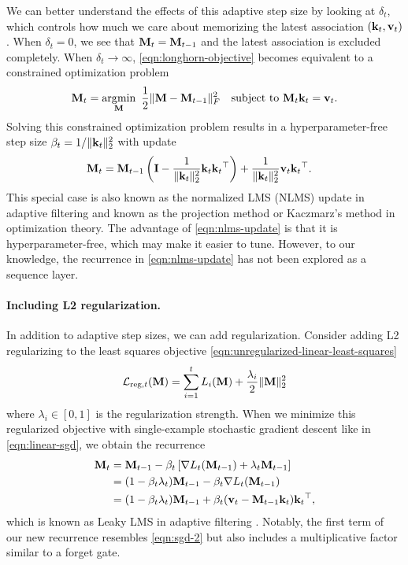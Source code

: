 \documentclass[notitlepage, 11pt]{article}
\begin{document}
We can better understand the effects of this adaptive step size by looking at $\delta_t$, which controls how much we care about memorizing the latest association $(\mathbf{k}_t, \mathbf{v}_t)$.
When $\delta_t = 0$, we see that $\mathbf{M}_t = \mathbf{M}_{t-1}$ and the latest association is excluded completely.
When $\delta_t \to \infty$, \autoref{eqn:longhorn-objective} becomes equivalent to a constrained optimization problem
\begin{align}
\mathbf{M}_{t} = \operatorname*{\arg\!\min}_{\mathbf{M}}\ \frac{1}{2}\lVert\mathbf{M} - \mathbf{M}_{t-1}\rVert_F^2\quad \text{subject to}\  \mathbf{M}_t\mathbf{k}_t = \mathbf{v}_t.\label{eqn:nlms-objective}
\end{align}
Solving this constrained optimization problem results in a hyperparameter-free step size $\beta_t=1/\lVert\mathbf{k}_t\rVert_2^2$ with update
\begin{align}
    \mathbf{M}_{t} &= \mathbf{M}_{t-1}\left(\mathbf{I} - \frac{1}{\lVert\mathbf{k}_t\rVert_2^2} {\mathbf{k}_t\mathbf{k}_t{}^\top}\right) + \frac{1}{ \lVert\mathbf{k}_t\rVert_2^2}\mathbf{v}_t\mathbf{k}_t{}^\top.\label{eqn:nlms-update}
\end{align}
This special case is also known as the normalized LMS (NLMS) update in adaptive filtering \citep{Castoldi2009MinimumdisturbanceDescriptionDevelopment} and known as the projection method \citep{Tanabe1971ProjectionMethodSolving} or Kaczmarz's method \citep{Kaczmarz1937AngenaherteAuflosungSystemen} in optimization theory.
The advantage of \autoref{eqn:nlms-update} is that it is hyperparameter-free, which may make it easier to tune.
However, to our knowledge, the recurrence in \autoref{eqn:nlms-update} has not been explored as a sequence layer.









\paragraph{Including L2 regularization.}
In addition to adaptive step sizes, we can add regularization.
Consider adding L2 regularizing to the least squares objective \autoref{eqn:unregularized-linear-least-squares}
\begin{align}
    \mathcal{L}_{\text{reg}, t}(\mathbf{M}) = \sum_{i=1}^t L_i(\mathbf{M}) + \frac{\lambda_i}{2}\lVert\mathbf{M}\rVert_2^2
\end{align}
where $\lambda_i\in [0, 1]$ is the regularization strength.
When we minimize this regularized objective with single-example stochastic gradient descent like in \autoref{eqn:linear-sgd}, we obtain the recurrence
\begin{align}
    \mathbf{M}_t &= \mathbf{M}_{t-1} -\beta_t \left[\nabla L_t(\mathbf{M}_{t-1}) + \lambda_t \mathbf{M}_{t-1}\right] \\
    &= (1 - \beta_t\lambda_t)\mathbf{M}_{t-1} -\beta_t \nabla L_t(\mathbf{M}_{t-1}) \\
    &= (1 - \beta_t\lambda_t) \mathbf{M}_{t-1} + \beta_t(\mathbf{v}_t - \mathbf{M}_{t-1}\mathbf{k}_t)\mathbf{k}_t{}^\top,\label{eqn:sgd-weight-decay-recurrence}
\end{align}
which is known as Leaky LMS in adaptive filtering \citep{Haykin2014AdaptiveFilterTheory}.
Notably, the first term of our new recurrence resembles \autoref{eqn:sgd-2} but also includes a multiplicative factor similar to a forget gate.
\end{document}

